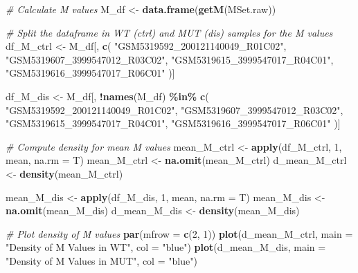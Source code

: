 \documentclass[
]{article}
\newenvironment{Shaded}{\begin{snugshade}}{\end{snugshade}}
\newcommand{\AttributeTok}[1]{\textcolor[rgb]{0.13,0.29,0.53}{#1}}
\newcommand{\CommentTok}[1]{\textcolor[rgb]{0.56,0.35,0.01}{\textit{#1}}}
\newcommand{\DecValTok}[1]{\textcolor[rgb]{0.00,0.00,0.81}{#1}}
\newcommand{\FunctionTok}[1]{\textcolor[rgb]{0.13,0.29,0.53}{\textbf{#1}}}
\newcommand{\NormalTok}[1]{#1}
\newcommand{\OtherTok}[1]{\textcolor[rgb]{0.56,0.35,0.01}{#1}}
\newcommand{\SpecialCharTok}[1]{\textcolor[rgb]{0.81,0.36,0.00}{\textbf{#1}}}
\newcommand{\StringTok}[1]{\textcolor[rgb]{0.31,0.60,0.02}{#1}}
\begin{document}
\begin{Shaded}
\begin{Highlighting}[]
\CommentTok{\# Calculate M values}
\NormalTok{M\_df }\OtherTok{\textless{}{-}} \FunctionTok{data.frame}\NormalTok{(}\FunctionTok{getM}\NormalTok{(MSet.raw))}

\CommentTok{\# Split the dataframe in WT (ctrl) and MUT (dis) samples for the M values}
\NormalTok{df\_M\_ctrl }\OtherTok{\textless{}{-}}\NormalTok{ M\_df[, }\FunctionTok{c}\NormalTok{(}
  \StringTok{"GSM5319592\_200121140049\_R01C02"}\NormalTok{,}
  \StringTok{"GSM5319607\_3999547012\_R03C02"}\NormalTok{,}
  \StringTok{"GSM5319615\_3999547017\_R04C01"}\NormalTok{,}
  \StringTok{"GSM5319616\_3999547017\_R06C01"}
\NormalTok{)]}

\NormalTok{df\_M\_dis }\OtherTok{\textless{}{-}}\NormalTok{ M\_df[, }\SpecialCharTok{!}\FunctionTok{names}\NormalTok{(M\_df) }\SpecialCharTok{\%in\%} \FunctionTok{c}\NormalTok{(}
  \StringTok{"GSM5319592\_200121140049\_R01C02"}\NormalTok{,}
  \StringTok{"GSM5319607\_3999547012\_R03C02"}\NormalTok{,}
  \StringTok{"GSM5319615\_3999547017\_R04C01"}\NormalTok{,}
  \StringTok{"GSM5319616\_3999547017\_R06C01"}
\NormalTok{)]}

\CommentTok{\# Compute density for mean M values}
\NormalTok{mean\_M\_ctrl }\OtherTok{\textless{}{-}} \FunctionTok{apply}\NormalTok{(df\_M\_ctrl, }\DecValTok{1}\NormalTok{, mean, }\AttributeTok{na.rm =}\NormalTok{ T)}
\NormalTok{mean\_M\_ctrl }\OtherTok{\textless{}{-}} \FunctionTok{na.omit}\NormalTok{(mean\_M\_ctrl)}
\NormalTok{d\_mean\_M\_ctrl }\OtherTok{\textless{}{-}} \FunctionTok{density}\NormalTok{(mean\_M\_ctrl)}

\NormalTok{mean\_M\_dis }\OtherTok{\textless{}{-}} \FunctionTok{apply}\NormalTok{(df\_M\_dis, }\DecValTok{1}\NormalTok{, mean, }\AttributeTok{na.rm =}\NormalTok{ T)}
\NormalTok{mean\_M\_dis }\OtherTok{\textless{}{-}} \FunctionTok{na.omit}\NormalTok{(mean\_M\_dis)}
\NormalTok{d\_mean\_M\_dis }\OtherTok{\textless{}{-}} \FunctionTok{density}\NormalTok{(mean\_M\_dis)}
\end{Highlighting}
\end{Shaded}

\begin{Shaded}
\begin{Highlighting}[]
\CommentTok{\# Plot density of M values}
\FunctionTok{par}\NormalTok{(}\AttributeTok{mfrow =} \FunctionTok{c}\NormalTok{(}\DecValTok{2}\NormalTok{, }\DecValTok{1}\NormalTok{))}
\FunctionTok{plot}\NormalTok{(d\_mean\_M\_ctrl, }\AttributeTok{main =} \StringTok{"Density of M Values in WT"}\NormalTok{, }\AttributeTok{col =} \StringTok{"blue"}\NormalTok{)}
\FunctionTok{plot}\NormalTok{(d\_mean\_M\_dis, }\AttributeTok{main =} \StringTok{"Density of M Values in MUT"}\NormalTok{, }\AttributeTok{col =} \StringTok{"blue"}\NormalTok{)}
\end{Highlighting}
\end{Shaded}
\end{document}
